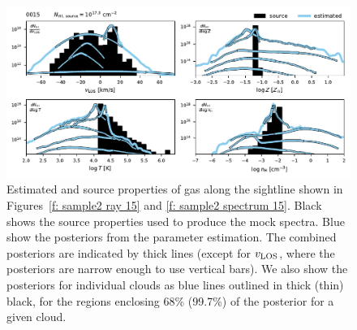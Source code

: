 \documentclass[fleqn,usenatbib]{mnras}
\begin{document}
\begin{figure}
    \centering
    \includegraphics[width=\textwidth]{figures/sample2/high-z/sightline_0015.pdf}
    \caption{
    Estimated and source properties of gas along the sightline shown in Figures~\ref{f: sample2 ray 15} and \ref{f: sample2 spectrum 15}.
    Black shows the source properties used to produce the mock spectra.
    Blue show the posteriors from the parameter estimation. 
    The combined posteriors are indicated by thick lines (except for $v_{\rm LOS}$, where the posteriors are narrow enough to use vertical bars).
    We also show the posteriors for individual clouds as blue lines outlined in thick (thin) black, for the regions enclosing 68\% (99.7\%) of the posterior for a given cloud.
    }
    \label{f: sample2 15}
\end{figure}
\end{document}
